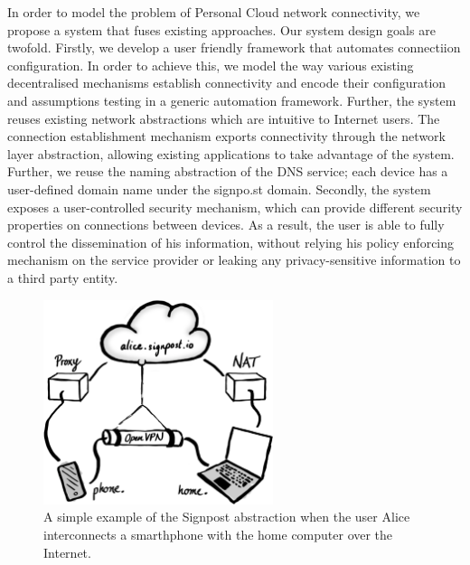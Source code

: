 In order to model the problem of Personal Cloud network connectivity, we propose
a system that fuses existing approaches. Our system design goals are twofold.
Firstly, we develop a user friendly framework that automates connectiion
configuration. In order to achieve this, we model the way various existing 
decentralised mechanisms establish connectivity and encode their configuration 
and assumptions testing in a generic
automation framework. Further, the system reuses existing network abstractions which are
intuitive to Internet users. The connection establishment mechanism exports
connectivity through the network layer abstraction, allowing existing
applications to take advantage of the system. Further, we reuse the naming
abstraction of the DNS service; each device has a user-defined domain name under
the signpo.st domain.  Secondly, the system exposes a user-controlled security
mechanism, which can provide different security properties on connections
between devices. As a result, the user is able to fully control the
dissemination of his information, without relying his policy enforcing mechanism
on the service provider or leaking any privacy-sensitive information to a third
party entity. 

\begin{figure}[ht]
  \begin{center}
	\includegraphics[width=0.6\textwidth]{signpost-illustration}
  \end{center}
  \caption{A simple example of the Signpost abstraction when the user Alice
    interconnects a smarthphone with the home computer over the Internet.}
  \label{fig:signpost-user-abstraction}
\end{figure}

